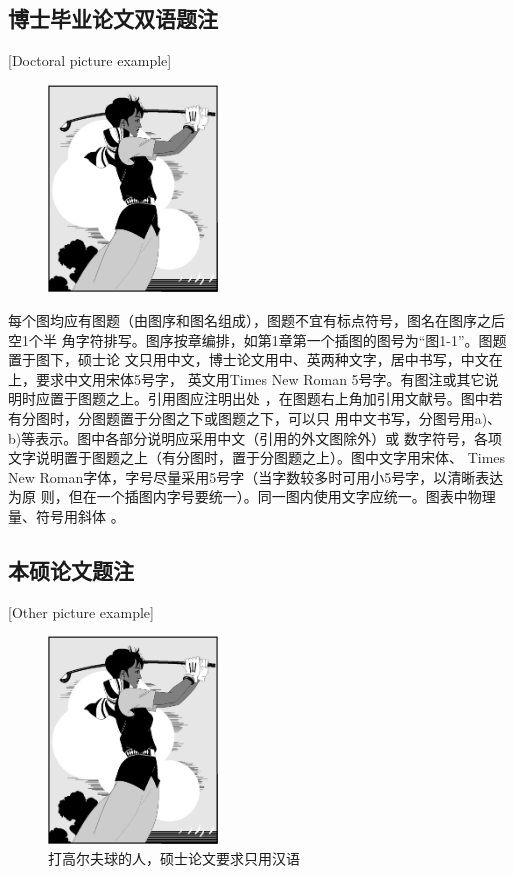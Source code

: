 \subsection{博士毕业论文双语题注}[Doctoral picture example]
\begin{figure}[htpb]
  \centering
  \includegraphics[width = 0.4\textwidth]{golfer}
\end{figure}

每个图均应有图题（由图序和图名组成），图题不宜有标点符号，图名在图序之后空1个半
角字符排写。图序按章编排，如第1章第一个插图的图号为“图1-1”。图题置于图下，硕士论
文只用中文，博士论文用中、英两种文字，居中书写，中文在上，要求中文用宋体5号字，
英文用Times New Roman 5号字。有图注或其它说明时应置于图题之上。引用图应注明出处
，在图题右上角加引用文献号。图中若有分图时，分图题置于分图之下或图题之下，可以只
用中文书写，分图号用a)、b)等表示。图中各部分说明应采用中文（引用的外文图除外）或
数字符号，各项文字说明置于图题之上（有分图时，置于分图题之上）。图中文字用宋体、
Times New Roman字体，字号尽量采用5号字（当字数较多时可用小5号字，以清晰表达为原
则，但在一个插图内字号要统一）。同一图内使用文字应统一。图表中物理量、符号用斜体
。
\subsection{本硕论文题注}[Other picture example]
\begin{figure}[h]
  \centering
  \includegraphics[width = 0.4\textwidth]{golfer}
  \caption{打高尔夫球的人，硕士论文要求只用汉语}
\end{figure}

